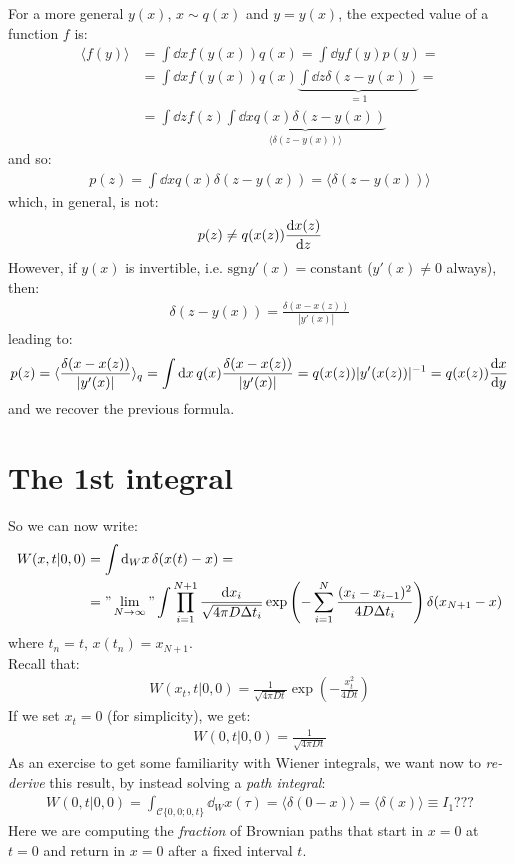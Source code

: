 \documentclass[../template.tex]{subfiles}
\begin{document}
For a more general $y(x)$, $x \sim q(x)$ and $y=y(x)$, the expected value of a function $f$ is:
\begin{align*}
    \langle f(y) \rangle &= \int \dd{x} f(y(x)) q(x) = \int \dd{y} f(y) p(y) = \\
    &= \int \dd{x} f(y(x)) q(x) \underbrace{\int \dd{z} \delta(z-y(x))}_{=1} = \\
    &= \int \dd{z} f(z) \underbrace{\int \dd{x} q(x) \delta(z-y(x))}_{\langle \delta(z-y(x)) \rangle}  
\end{align*}    
and so:
\begin{align*}
    p(z) = \int \dd{x} q(x) \delta(z- y(x)) = \langle \delta (z-y(x)) \rangle
\end{align*}
which, in general, is not:
\begin{align*}
    p(z) \neq q(x(z)) \dv{x(z)}{z}
\end{align*}
However, if $y(x)$ is invertible, i.e. $\mathrm{sgn} y'(x) = \text{constant}$ ($y'(x) \neq 0$ always), then:
\begin{align*}
    \delta(z-y(x)) = \frac{\delta(x-x(z))}{|y'(x)|} 
\end{align*} 
leading to:
\begin{align*}
    p(z) = \langle \frac{\delta(x-x(z))}{|y'(x)|}  \rangle_q = \int \dd{x} q(x) \frac{\delta(x-x(z))}{|y'(x)|} = q(x(z)) |y'(x(z))|^{-1} = q(x(z)) \dv{x}{y}  
\end{align*}
and we recover the previous formula.

\section{The 1st integral}
So we can now write:
\begin{align*}
    W(x,t|0,0) &= \int \dd{_W x} \delta(x(t)-x) =\\
    &= "\lim_{N \to \infty}"
    \int \prod_{i=1}^{N+1} \frac{\dd{x_i}}{\sqrt{4 \pi D \Delta t_i}} \exp\left(-\sum_{i=1}^N \frac{(x_i - x_{i-1})^2}{4 D \Delta t_i} \right) \delta(x_{N+1} - x)
\end{align*}
where $t_n = t$, $x(t_n) = x_{N+1}$.\\

Recall that:
\begin{align*}
    W(x_t,t|0,0) = \frac{1}{\sqrt{4 \pi D t}} \exp \left(-\frac{x_t^2}{4 D t} \right)
\end{align*}
If we set $x_t = 0$ (for simplicity), we get:
\begin{align}
    W(0, t | 0,0) = \frac{1}{\sqrt{4 \pi D t}} 
    \label{eqn:I1res}
\end{align} 
As an exercise to get some familiarity with Wiener integrals, we want now to \textit{re-derive} this result, by instead solving a \textit{path integral}:
\begin{align*}
    W(0,t|0,0) = \int_{\mathcal{C}\{0,0;0,t\}} \dd{_Wx(\tau)} = \langle \delta(0 - x) \rangle = \langle \delta(x) \rangle \equiv I_1 ???
\end{align*}  
Here we are computing the \textit{fraction} of Brownian paths that start in $x=0$ at $t=0$ and return in $x=0$ after a fixed interval $t$.
\end{document}
